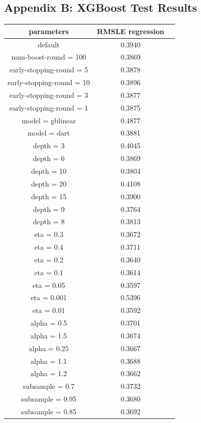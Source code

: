 \documentclass[a4paper]{article}
\begin{document}
\subsection{Appendix B: XGBoost Test Results}
\begin{table}[h!]
    \centering
    \begin{tabular}{ccc}
        parameters & RMSLE regression\\
        \hline
        default & 0.3940 \\
        num-boost-round = 100 & 0.3869 \\
        early-stopping-round = 5 & 0.3878 \\
        early-stopping-round = 10 & 0.3896 \\
        early-stopping-round = 3 & 0.3877 \\
        early-stopping-round = 1 & 0.3875 \\
        model = gblinear & 0.4877 \\
        model = dart & 0.3881 \\
        depth = 3 & 0.4045 \\
        depth = 6 & 0.3869 \\
        depth = 10 & 0.3804 \\
        depth = 20 & 0.4108 \\
        depth = 15 & 0.3900 \\
        depth = 9 & 0.3764 \\
        depth = 8 & 0.3813 \\
        eta = 0.3 & 0.3672 \\
        eta = 0.4 & 0.3711 \\
        eta = 0.2 & 0.3640 \\
        eta = 0.1 & 0.3614 \\
        eta = 0.05 & 0.3597 \\
        eta = 0.001 & 0.5396 \\
        eta = 0.01 & 0.3592 \\
        alpha = 0.5 & 0.3701 \\
        alpha = 1.5 & 0.3674 \\
        alpha = 0.25 & 0.3667 \\
        alpha = 1.1 & 0.3688 \\
        alpha = 1.2 & 0.3662 \\
        subsample = 0.7 & 0.3732 \\
        subsample = 0.95 & 0.3680 \\
        subsample = 0.85& 0.3692 \\

\end{tabular}
\end{table}
\end{document}
